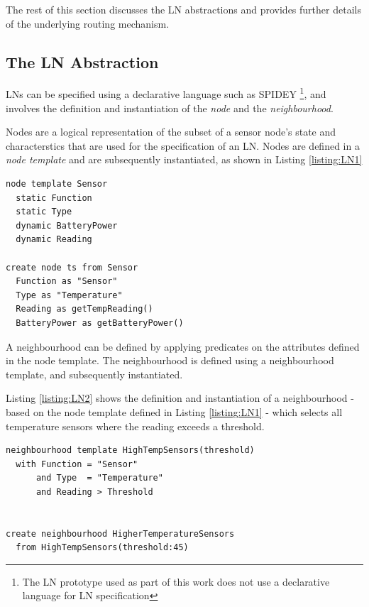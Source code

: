 The rest of this section discusses the LN abstractions and provides further
details of the underlying routing mechanism.

\subsection{The LN Abstraction}

LNs can be specified using a declarative language such as SPIDEY
\cite{mottola_LN:2006, mottola_LNScoping:2006}\footnote{The LN prototype used as
part of this work does not use a declarative language for LN specification}, and
involves the definition and instantiation of the \emph{node} and the
\emph{neighbourhood}. 

Nodes are a logical representation of the subset of a sensor node's state and
characterstics that are used for the specification of an LN. Nodes are defined
in a \emph{node template} and are subsequently instantiated, as shown in Listing \ref{listing:LN1}
   
\begin{lstlisting}[frame=trbl, basewidth={0.55em, 0.6em}, captionpos=b, 
basicstyle=\ttfamily\footnotesize, breaklines, caption = Node Definition and Instantiation, label = listing:LN1]  
node template Sensor
  static Function
  static Type
  dynamic BatteryPower
  dynamic Reading

create node ts from Sensor
  Function as "Sensor"
  Type as "Temperature"
  Reading as getTempReading()
  BatteryPower as getBatteryPower()
\end{lstlisting}

A neighbourhood can be defined by applying predicates on the attributes defined
in the
node template. The neighbourhood is defined using a neighbourhood
template, and subsequently instantiated. 

Listing \ref{listing:LN2} shows the definition and
instantiation of a
neighbourhood - based on the node template defined in Listing \ref{listing:LN1}
- which selects all temperature sensors where the reading exceeds a threshold.
 
\begin{lstlisting}[frame=trbl, basewidth={0.55em, 0.6em}, captionpos=b, 
basicstyle=\ttfamily\footnotesize, breaklines, caption = Neighbourhood Definition and Instantiation, label = listing:LN2]  
neighbourhood template HighTempSensors(threshold)
  with Function = "Sensor" 
      and Type  = "Temperature" 
      and Reading > Threshold


create neighbourhood HigherTemperatureSensors
  from HighTempSensors(threshold:45)
\end{lstlisting}

